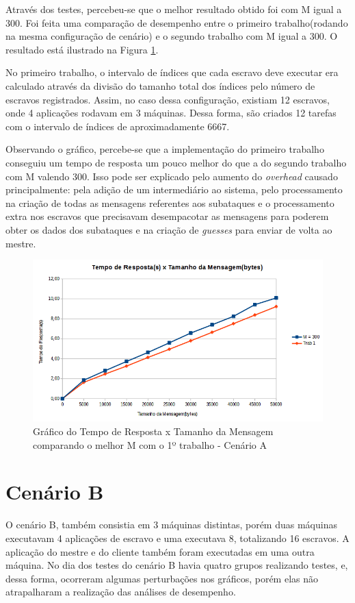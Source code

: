 \documentclass[
	12pt,				%
    oneside,			%
	a4paper,			%
	english,			%
	brazil,				%
	]{abntex2}
\begin{document}
Através dos testes, percebeu-se que o melhor resultado obtido foi com M igual a 300. Foi feita uma comparação de desempenho entre o primeiro trabalho(rodando na mesma configuração de cenário) e o segundo trabalho com M igual a 300. O resultado está ilustrado na Figura \ref{fig:tempo_respostaXtamanho_msg_A_T1}.

No primeiro trabalho, o intervalo de índices que cada escravo deve executar era calculado através da divisão do tamanho total dos índices pelo número de escravos registrados. Assim, no caso dessa configuração, existiam 12 escravos, onde 4 aplicações rodavam em 3 máquinas. Dessa forma, são criados 12 tarefas com o intervalo de índices de aproximadamente 6667.

Observando o gráfico, percebe-se que a implementação do primeiro trabalho conseguiu um tempo de resposta um pouco melhor do que a do segundo trabalho com M valendo 300. Isso pode ser explicado pelo aumento do \textit{overhead} causado principalmente: pela adição de um intermediário ao sistema, pelo processamento na criação de todas as mensagens referentes aos subataques e o processamento extra nos escravos que precisavam desempacotar as mensagens para poderem obter os dados dos subataques e na criação de \textit{guesses} para enviar de volta ao mestre.

\begin{figure}[!htb]
\centering
\includegraphics[scale=0.7]{figuras/A_T1.png}
\caption{Gráfico do Tempo de Resposta x Tamanho da Mensagem comparando o melhor M com o 1º trabalho - Cenário A}
\label{fig:tempo_respostaXtamanho_msg_A_T1}
\end{figure}

\section{Cenário B}
O cenário B, também consistia em 3 máquinas distintas, porém duas máquinas executavam 4 aplicações de escravo e uma executava 8, totalizando 16 escravos. A aplicação do mestre e do cliente também foram executadas em uma outra máquina. No dia dos testes do cenário B havia quatro grupos realizando testes, e, dessa forma, ocorreram algumas perturbações nos gráficos, porém elas não atrapalharam a realização das análises de desempenho.
\end{document}
